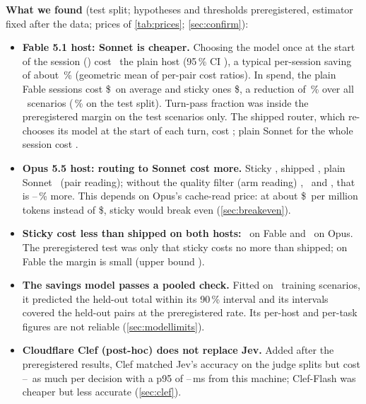 \begin{keyidea}
\textbf{What we found} (test split; hypotheses and thresholds preregistered, estimator fixed after the data;
prices of \cref{tab:prices};
\cref{sec:confirm}):
\begin{itemize}[leftmargin=1.2em]
  \item \textbf{Fable 5.1 host: Sonnet is cheaper.} Choosing the model once at the start of the session
    () cost \CfFableStickyPairTwo\X\ the plain host (95\,\% CI \CfFableStickyPairCITwo), a
    typical per-session saving of about \CfFableStickySaving\,\% (geometric mean of per-pair cost ratios). In
    spend, the plain Fable sessions cost \$\RvSpendAnchor\ on average and sticky ones \$\RvSpendSticky, a
    reduction of \RvSpendCutAll\,\% over all \NScenarios\ scenarios (\RvSpendCutTest\,\% on the test split).
    Turn-pass fraction was inside the preregistered margin on the test scenarios only. The shipped router, which re-chooses its model at the start of each turn, cost
    \CfFableShippedPairTwo\X; plain Sonnet for the whole session cost \CfFableSonnetPairTwo\X.
  \item \textbf{Opus 5.5 host: routing to Sonnet cost more.} Sticky \CfOpusStickyPairTwo\X, shipped
    \CfOpusShippedPairTwo\X, plain Sonnet \CfOpusSonnetPairTwo\X\ (pair reading); without the quality filter
    (arm reading) \CfOpusStickyArmTwo\X, \CfOpusShippedArmTwo\X\ and \CfOpusSonnetArmTwo\X, that is
    \CfOpusStickyArmExtra--\CfOpusSonnetArmExtra\,\% more. This depends on Opus's cache-read price: at about
    \$\BEStickyPair\ per million tokens instead of \$\PriceOpusRead, sticky would break even
    (\cref{sec:breakeven}).
  \item \textbf{Sticky cost less than shipped on both hosts:} \HThreeFable\X\ on Fable and \HThreeOpus\X\ on
    Opus. The preregistered test was only that sticky costs no more than shipped; on Fable the margin is small
    (upper bound \HThreeFableUpper).
  \item \textbf{The savings model passes a pooled check.} Fitted on \NTrain\ training scenarios, it
    predicted the held-out total within its 90\,\% interval and its intervals covered the held-out pairs at
    the preregistered rate. Its per-host and per-task figures are not reliable (\cref{sec:modellimits}).
  \item \textbf{Cloudflare Clef (post-hoc) does not replace Jev.} Added after the preregistered results, Clef matched
    Jev's accuracy on the judge splits but cost \ClClefCostXLow--\ClClefCostXHigh\X\ as much per decision with a p95 of
    \ClClefPninetyfiveLow--\ClClefPninetyfiveHigh\,ms from this machine; Clef-Flash was cheaper but less accurate
    (\cref{sec:clef}).
\end{itemize}
\end{keyidea}

